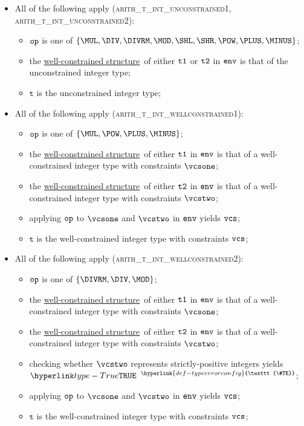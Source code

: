 \documentclass{book}
\newcommand\TypeErrorConfig[0]{\hyperlink{def-typeerrorconfig}{\texttt{\#TE}}}
\newcommand\ProseOrTypeError[0]{\hyperlink{def-proseortypeerror}{$^{\TypeErrorConfig}$}}
\newcommand\wellconstrainedstructure[0]{\hyperlink{def-getwellconstrainedstructure}{well-constrained structure}}
\newcommand\vt[0]{\texttt{t}}
\begin{document}
\begin{itemize}
  \item All of the following apply (\textsc{arith\_t\_int\_unconstrained1}, \\
                                    \textsc{arith\_t\_int\_unconstrained2}):
  \begin{itemize}
    \item $\texttt{op}$ is one of $\{\MUL, \DIV, \DIVRM, \MOD, \SHL,  \SHR, \POW, \PLUS, \MINUS\}$;
    \item the \wellconstrainedstructure\ of either $\texttt{t1}$ or $\texttt{t2}$ in $\texttt{env}$ is that of the unconstrained integer type;
    \item $\vt$ is the unconstrained integer type;
  \end{itemize}

  \item All of the following apply (\textsc{arith\_t\_int\_wellconstrained1}):
  \begin{itemize}
    \item $\texttt{op}$ is one of $\{\MUL, \POW, \PLUS, \MINUS\}$;
    \item the \wellconstrainedstructure\ of either $\texttt{t1}$ in $\texttt{env}$ is that of a well-constrained integer type with
          constraints $\vcsone$;
          \item the \wellconstrainedstructure\ of either $\texttt{t2}$ in $\texttt{env}$ is that of a well-constrained integer type with
          constraints $\vcstwo$;
    \item applying $\texttt{op}$ to $\vcsone$ and $\vcstwo$ in $\texttt{env}$ yields $\texttt{vcs}$;
    \item $\vt$ is the well-constrained integer type with constraints $\texttt{vcs}$;
  \end{itemize}

  \item All of the following apply (\textsc{arith\_t\_int\_wellconstrained2}):
  \begin{itemize}
    \item $\texttt{op}$ is one of $\{\DIVRM, \DIV, \MOD\}$;
    \item the \wellconstrainedstructure\ of either $\texttt{t1}$ in $\texttt{env}$ is that of a well-constrained integer type with
          constraints $\vcsone$;
          \item the \wellconstrainedstructure\ of either $\texttt{t2}$ in $\texttt{env}$ is that of a well-constrained integer type with
          constraints $\vcstwo$;
    \item checking whether $\vcstwo$ represents strictly-positive integers yields $\True$ \ProseOrTypeError;
    \item applying $\texttt{op}$ to $\vcsone$ and $\vcstwo$ in $\texttt{env}$ yields $\texttt{vcs}$;
    \item $\vt$ is the well-constrained integer type with constraints $\texttt{vcs}$;
  \end{itemize}


\end{itemize}
\end{document}
